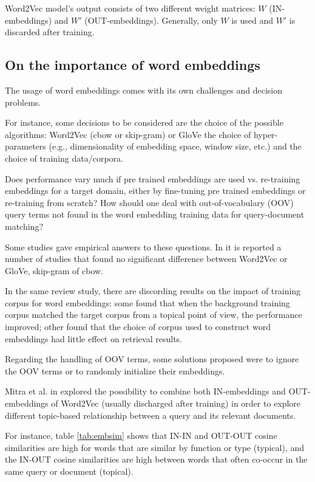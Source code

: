 Word2Vec model's output consists of two different weight matrices: $W$ (IN-embeddings) and $W'$ (OUT-embeddings). Generally, only $W$ is used and $W'$ is discarded after training.

\subsection{On the importance of word embeddings}
The usage of word embeddings comes with its own challenges and decision problems.

For instance, some decisions to be considered are the choice of the possible algorithms: Word2Vec (cbow or skip-gram) \cite{w2v} or GloVe the choice of hyper-parameters (e.g., dimensionality of embedding space, window size, etc.) and the choice of training data/corpora.

Does performance vary much if pre trained embeddings are used vs. re-training embeddings for a target domain, either by fine-tuning pre trained embeddings or re-training from scratch? How should one deal with out-of-vocabulary (OOV) query terms not found in the word embedding training data for query-document matching?

Some studies gave empirical answers to these questions. In \cite{neurev} it is reported a number of studies that found no significant difference between Word2Vec or GloVe, skip-gram of cbow.

In the same review study, there are discording results on the impact of training corpus for word embeddings: some found that when the background training corpus matched the target corpus from a topical point of view, the performance improved; other found that the choice of corpus used to construct word embeddings had little effect on retrieval results.

Regarding the handling of OOV terms, some solutions proposed were to ignore the OOV terms or to randomly initialize their embeddings.

Mitra et al. in \cite{Mitra2016ADE} explored the possibility to combine both IN-embeddings and OUT-embeddings of Word2Vec (usually discharged after training) in order to explore different topic-based relationship between a query and its relevant documents.

For instance, table \ref{tab:embsim} shows that IN-IN and OUT-OUT cosine similarities are high for words that are similar by function or type (typical), and the IN-OUT cosine similarities are high between words that often co-occur in the same query or document (topical).

